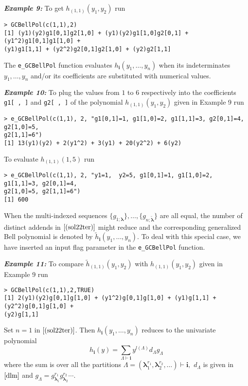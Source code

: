 \hskip-0.5cm\textbf{\emph{Example 9:}} To get \(h_{(1,1)}(y_1, y_2)\)
run

\begin{verbatim}
> GCBellPol(c(1,1),2)
[1] (y1)(y2)g1[0,1]g2[1,0] + (y1)(y2)g1[1,0]g2[0,1] + (y1^2)g1[0,1]g1[1,0] +
(y1)g1[1,1] + (y2^2)g2[0,1]g2[1,0] + (y2)g2[1,1]
\end{verbatim}

The \texttt{e\_GCBellPol} function evaluates
\(h_{\boldsymbol{i}}(y_1, \ldots, y_n)\) when its indeterminates
\(y_1, \ldots, y_n\) and/or its coefficients are substituted with
numerical values.

\hskip-0.5cm\textbf{\emph{Example 10:}} To plug the values from \(1\) to
\(6\) respectively into the coefficients \texttt{g1{[}\ ,\ {]}} and
\texttt{g2{[}\ ,\ {]}} of the polynomial \(h_{(1,1)}(y_1, y_2)\) given
in Example 9 run

\begin{verbatim}
> e_GCBellPol(c(1,1), 2, "g1[0,1]=1, g1[1,0]=2, g1[1,1]=3, g2[0,1]=4, g2[1,0]=5, 
g2[1,1]=6")
[1] 13(y1)(y2) + 2(y1^2) + 3(y1) + 20(y2^2) + 6(y2)
\end{verbatim}

\noindent To evaluate \(h_{(1,1)}(1, 5)\) run

\begin{verbatim}
> e_GCBellPol(c(1,1), 2, "y1=1,  y2=5, g1[0,1]=1, g1[1,0]=2, g1[1,1]=3, g2[0,1]=4, 
g2[1,0]=5, g2[1,1]=6")
[1] 600
\end{verbatim}

When the multi-indexed sequences
\(\{ g_{1; \boldsymbol{\lambda}}\}, \ldots, \{ g_{n; \boldsymbol{\tilde{\lambda}}}\}\)
are all equal, the number of distinct addends in \(\eqref{(sol22ter)}\)
might reduce and the corresponding generalized Bell polynomial is
denoted by \(\tilde{h}_{\boldsymbol{i}}(y_1, \ldots, y_n)\). To deal
with this special case, we have inserted an input flag parameter in the
\texttt{e\_GCBellPol} function.

\hskip-0.5cm\textbf{\emph{Example 11:}} To compare
\(\tilde{h}_{(1,1)}(y_1, y_2)\) with \(h_{(1,1)}(y_1, y_2)\) given in
Example 9 run

\begin{verbatim}
> GCBellPol(c(1,1),2,TRUE)
[1] 2(y1)(y2)g[0,1]g[1,0] + (y1^2)g[0,1]g[1,0] + (y1)g[1,1] + (y2^2)g[0,1]g[1,0] +
(y2)g[1,1]
\end{verbatim}

Set \(n=1\) in \(\eqref{(sol22ter)}\). Then
\(h_{\boldsymbol{i}}(y_1, \ldots, y_n)\) reduces to the univariate
polynomial\\
\begin{equation}
h_{\boldsymbol{i}}(y) =  \sum_{{\Lambda} \vdash  \boldsymbol{i}} y^{l(\Lambda)} d_{\Lambda}  
g_{\Lambda}
\label{(redGC)}
\end{equation} where the sum is over all the partitions
\(\Lambda=(\boldsymbol{\lambda}_1^{r_1} , \boldsymbol{\lambda}_2^{r_2}, \ldots) \vdash \boldsymbol{i},\)
\(d_{\Lambda}\) is given in \(\eqref{dlm}\) and
\(g_{\Lambda} = g_{\boldsymbol{\lambda}_1}^{r_1} g_{\boldsymbol{\lambda}_2}^{r_2} \cdots.\)

